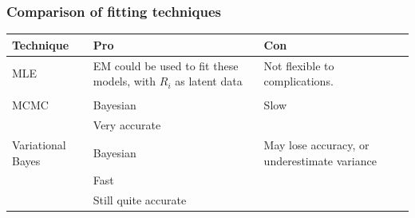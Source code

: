\documentclass{beamer}
\begin{document}
\begin{frame}
	\frametitle{Comparison of fitting techniques}
	\begin{tabular}{p{2cm}p{3.5cm}p{4.5cm}}
		Technique         & Pro                                                             & Con                                          \\
		\hline
		MLE               & EM could be used to fit these models, with $R_i$ as latent data & Not flexible to complications.               \\
		                  &                                                                 &                                              \\ %
		\hline
		MCMC              & Bayesian                                                        & Slow                                         \\
		                  & Very accurate                                                   &                                              \\
		\hline
		Variational Bayes & Bayesian                                                        & May lose accuracy, or underestimate variance \\
		                  & Fast                                                            &                                              \\ %
		                  & Still quite accurate                                            &                                              \\
		\hline
	\end{tabular}
						
\end{frame}
\end{document}
